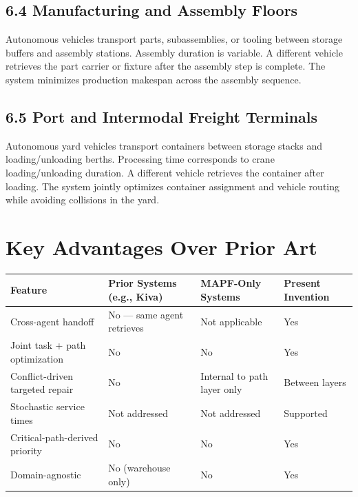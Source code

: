 \documentclass[12pt]{article}
\begin{document}
\subsection{6.4 \quad Manufacturing and Assembly Floors}
Autonomous vehicles transport parts, subassemblies, or tooling between storage buffers and assembly stations. Assembly duration is variable. A different vehicle retrieves the part carrier or fixture after the assembly step is complete. The system minimizes production makespan across the assembly sequence.

\subsection{6.5 \quad Port and Intermodal Freight Terminals}
Autonomous yard vehicles transport containers between storage stacks and loading/unloading berths. Processing time corresponds to crane loading/unloading duration. A different vehicle retrieves the container after loading. The system jointly optimizes container assignment and vehicle routing while avoiding collisions in the yard.

\section{Key Advantages Over Prior Art}

\begin{center}
\begin{tabular}{>{\raggedright}p{5cm} >{\centering}p{2.8cm} >{\centering}p{2.8cm} >{\centering\arraybackslash}p{2.8cm}}
\toprule
\textbf{Feature} & \textbf{Prior Systems (e.g., Kiva)} & \textbf{MAPF-Only Systems} & \textbf{Present Invention} \\
\midrule
Cross-agent handoff              & No --- same agent retrieves & Not applicable & Yes \\
Joint task + path optimization   & No & No & Yes \\
Conflict-driven targeted repair  & No & Internal to path layer only & Between layers \\
Stochastic service times         & Not addressed & Not addressed & Supported \\
Critical-path-derived priority   & No & No & Yes \\
Domain-agnostic                  & No (warehouse only) & No & Yes \\
\bottomrule
\end{tabular}
\end{center}
\end{document}

